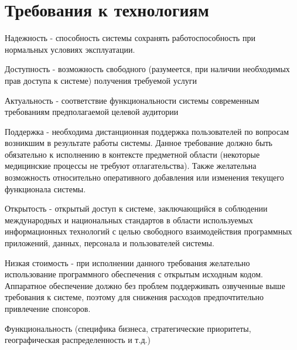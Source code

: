 \section{Требования к технологиям}
Надежность - способность системы сохранять работоспособность при нормальных
условиях эксплуатации.

Доступность - возможность свободного (разумеется, при наличии необходимых прав
доступа к системе) получения требуемой услуги 

Актуальность - соответствие
функциональности системы современным требованиям предполагаемой целевой
аудитории 

Поддержка - необходима дистанционная поддержка пользователей по
вопросам возникшим в результате работы системы. Данное требование должно быть
обязательно к исполнению в контексте предметной области (некоторые медицинские
процессы не требуют отлагательства). Также желательна возможность относительно
оперативного добавления или изменения текущего функционала системы.

Открытость - открытый доступ к системе, заключающийся в соблюдении
международных и национальных стандартов в области используемых информационных
технологий с целью свободного взаимодействия  программных приложений, данных,
персонала и пользователей системы.

Низкая стоимость - при исполнении данного требования желательно использование
программного обеспечения с открытым исходным кодом. Аппаратное обеспечение
должно без проблем поддерживать озвученные выше требования к системе, поэтому
для снижения расходов предпочтительно привлечение спонсоров.

Функциональность (специфика бизнеса, стратегические приоритеты, географическая
распределенность и т.д.)
